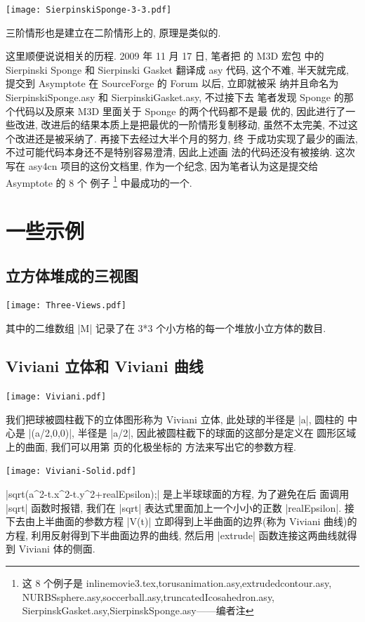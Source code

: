\documentclass[nofonts,CJKnormalspaces]{ctexbook}
\newcommand\transnote[1]{\footnote{#1——编者注}}
\begin{document}

\begin{center}
  \texttt{[image: SierpinskiSponge-3-3.pdf]}
\end{center}
三阶情形也是建立在二阶情形上的, 原理是类似的.

这里顺便说说相关的历程. 2009 年 11 月 17 日, 笔者把 \MP{} 的 M3D 宏包
中的 Sierpinski Sponge 和 Sierpinski Gasket 翻译成 asy 代码, 这个不难,
半天就完成, 提交到 Asymptote 在 SourceForge 的 Forum 以后, 立即就被采
纳并且命名为 SierpinskiSponge.asy 和 SierpinskiGasket.asy, 不过接下去
笔者发现 Sponge 的那个代码以及原来 M3D 里面关于 Sponge 的两个代码都不是最
优的, 因此进行了一些改进, 改进后的结果本质上是把最优的一阶情形复制移动,
虽然不太完美, 不过这个改进还是被采纳了. 再接下去经过大半个月的努力, 终
于成功实现了最少的画法, 不过可能代码本身还不是特别容易澄清, 因此上述画
法的代码还没有被接纳. 这次写在 asy4cn 项目的这份文档里, 作为一个纪念,
因为笔者认为这是提交给 Asymptote 的 8 个 例子
\transnote{这 8 个例子是
  inlinemovie3.tex,torusanimation.asy,extrudedcontour.asy,
  NURBSsphere.asy,soccerball.asy,truncatedIcosahedron.asy,
  SierpinskGasket.asy,SierpinskSponge.asy}
中最成功的一个.

\section{一些示例}

\subsection{立方体堆成的三视图}
\begin{center}\texttt{[image: Three-Views.pdf]}\end{center}%

其中的二维数组 |M| 记录了在 3*3 个小方格的每一个堆放小立方体的数目.
\subsection{Viviani 立体和 Viviani 曲线}
\begin{center}\texttt{[image: Viviani.pdf]}\end{center}%

我们把球被圆柱截下的立体图形称为 Viviani 立体, 此处球的半径是 |a|, 圆柱的
中心是 |(a/2,0,0)|, 半径是 |a/2|, 因此被圆柱截下的球面的这部分是定义在
圆形区域上的曲面, 我们可以用第 \pageref{surface:local} 页的化极坐标的
方法来写出它的参数方程.
\begin{center}\texttt{[image: Viviani-Solid.pdf]}\end{center}%

|sqrt(a^2-t.x^2-t.y^2+realEpsilon);| 是上半球球面的方程, 为了避免在后
面调用 |sqrt| 函数时报错, 我们在 |sqrt| 表达式里面加上一个小小的正数
|realEpsilon|. 接下去由上半曲面的参数方程 |V(t)| 立即得到上半曲面的边界(称为
Viviani 曲线)的方程, 利用反射得到下半曲面边界的曲线, 然后用 |extrude|
函数连接这两曲线就得到 Viviani 体的侧面.
\end{document}
